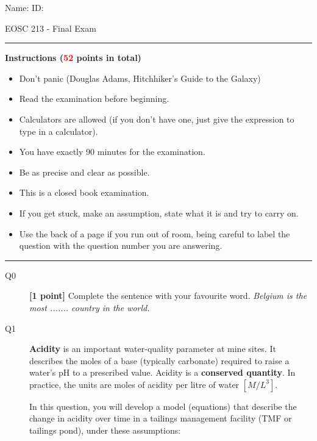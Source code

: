 \documentclass{article}
\begin{document}
\lstset{numbers=left, numberstyle=\small, stepnumber=1, numbersep=5pt,language=python}

\pagestyle{first}
\large{Name:} \hspace{11cm} \large{ID: }
\begin{center}
\Huge{EOSC 213 - Final Exam}
\end{center}

\rule{\textwidth}{1pt}

\large{\textbf{Instructions (\textcolor{red}{52} points in total)}}
\begin{multicols}{2}
\begin{itemize}
\item Don't panic (Douglas Adams, Hitchhiker's Guide to the Galaxy)
\item Read the examination before beginning.
\item Calculators are allowed (if you don't have one, just give the expression to type in a calculator).
\item You have exactly 90 minutes for the examination.
\item Be as precise and clear as possible.
\item This is a closed book examination.
\item If you get stuck, make an assumption, state what it is and try to carry on.
\item Use the back of a page if you run out of room, being careful to label the question with the question number you are answering.  
\end{itemize} 
\end{multicols}


\rule{\textwidth}{1pt}

\begin{description}
\item [Q0]  \textbf{[1 point]} Complete the sentence with your favourite word. \textit{Belgium is the most ....... country in the world.} 
\vspace{0.25cm}

\end{description}


\begin{description}
\item[Q1] \textbf{Acidity} is an important water-quality parameter at mine sites. It describes the moles of a base (typically carbonate) required to raise a water's pH to a prescribed value. Acidity is a \textbf{conserved quantity}. In practice, the units are moles of acidity per litre of water $[M/L^3]$.   


In this question, you will develop a model (equations) that describe the change in acidity over time in a tailings management facility (TMF or tailings pond), under these assumptions:
\end{description}
\end{document}
